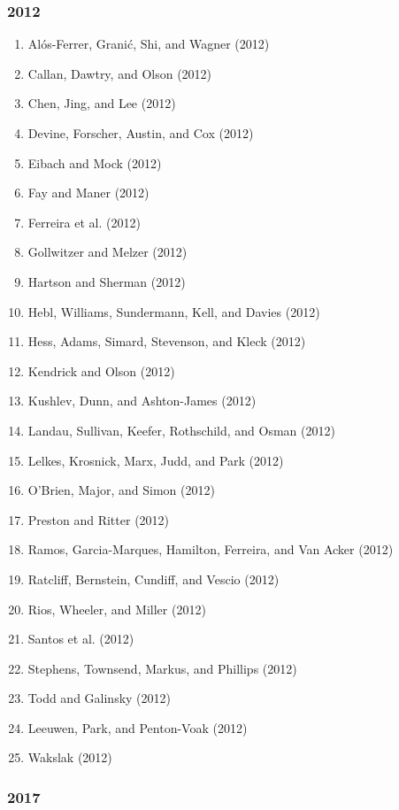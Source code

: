 \documentclass[english,man]{apa6}
\providecommand{\tightlist}{%
  \setlength{\itemsep}{0pt}\setlength{\parskip}{0pt}}
\theoremstyle{definition}
\theoremstyle{definition}
\theoremstyle{definition}
\theoremstyle{remark}
\begin{document}
\subsubsection{2012}\label{section-46}

\begin{enumerate}
\def\labelenumi{\arabic{enumi})}
\tightlist
\item
  Alós-Ferrer, Granić, Shi, and Wagner (2012)
\item
  Callan, Dawtry, and Olson (2012)
\item
  Chen, Jing, and Lee (2012)
\item
  Devine, Forscher, Austin, and Cox (2012)
\item
  Eibach and Mock (2012)
\item
  Fay and Maner (2012)
\item
  Ferreira et al. (2012)
\item
  Gollwitzer and Melzer (2012)
\item
  Hartson and Sherman (2012)
\item
  Hebl, Williams, Sundermann, Kell, and Davies (2012)
\item
  Hess, Adams, Simard, Stevenson, and Kleck (2012)
\item
  Kendrick and Olson (2012)
\item
  Kushlev, Dunn, and Ashton-James (2012)
\item
  Landau, Sullivan, Keefer, Rothschild, and Osman (2012)
\item
  Lelkes, Krosnick, Marx, Judd, and Park (2012)
\item
  O'Brien, Major, and Simon (2012)
\item
  Preston and Ritter (2012)
\item
  Ramos, Garcia-Marques, Hamilton, Ferreira, and Van Acker (2012)
\item
  Ratcliff, Bernstein, Cundiff, and Vescio (2012)
\item
  Rios, Wheeler, and Miller (2012)
\item
  Santos et al. (2012)
\item
  Stephens, Townsend, Markus, and Phillips (2012)
\item
  Todd and Galinsky (2012)
\item
  Leeuwen, Park, and Penton-Voak (2012)
\item
  Wakslak (2012)
\end{enumerate}

\subsubsection{2017}\label{section-47}
\end{document}
